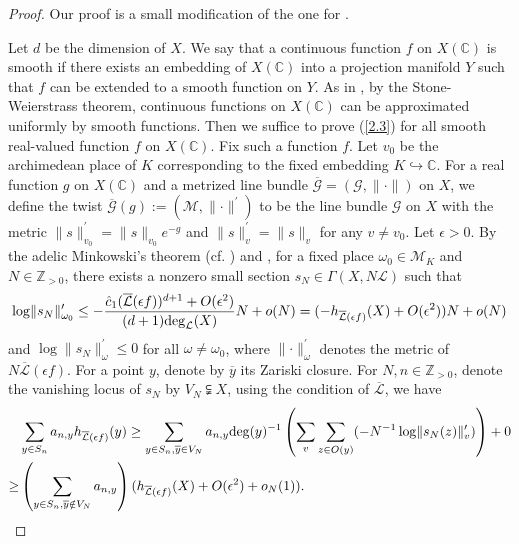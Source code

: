 \documentclass[12pt]{amsart}
\theoremstyle{plain}
\theoremstyle{remark}
\theoremstyle{definition}
\def\Z{\mathbb Z}
\def\C{\mathbb C}
\begin{document}
\begin{proof}
Our proof is a small modification of the one for \cite[Theorem 3.1]{Yuan2008}. 

Let $d$ be the dimension of $X$. We say that a continuous function $f$ on $X(\C)$ is smooth if there exists an embedding of $X(\C)$ into a projection manifold $Y$ such that $f$ can be extended to a smooth function on $Y$. As in \cite{Zhang1998}, by the Stone-Weierstrass theorem, continuous functions on $X(\C)$ can be approximated uniformly by smooth functions. Then we suffice to prove (\ref{2.3}) for all smooth real-valued function $f$ on $X(\C)$. Fix such a function $f$. Let $v_0$ be the archimedean place of $K$ corresponding to the fixed embedding $K\hookrightarrow\C$. For a real function $g$ on $X(\C)$ and a metrized line bundle $\overline{\mathcal{G}}=(\mathcal{G},\lVert\cdot\rVert)$ on $X$, we define the twist $\overline{\mathcal{G}}(g):=(\mathcal{M},\lVert\cdot\rVert^\prime)$ to be the line bundle $\mathcal{G}$ on $X$ with the metric $\lVert s\rVert^\prime_{v_0}=\lVert s\rVert_{v_0}e^{-g}$ and $\lVert s\rVert^\prime_{v}=\lVert s\rVert_{v}$ for any $v\neq v_0$. Let $\epsilon>0$. By the adelic Minkowski's theorem (cf. \cite[Appendix C]{Bombieri2006}) and \cite[Lemma 3.3]{Yuan2008}, for a fixed place $\omega_0\in\mathcal{M}_K$ and $N\in\Z_{>0}$, there exists a nonzero small section $s_N\in\Gamma(X,N\mathcal{L})$ such that $$\log\lVert s_N\rVert^\prime_{\omega_0}\leq-\frac{\hat{c}_1(\overline{\mathcal{L}}(\epsilon f))^{d+1}+O(\epsilon^2)}{(d+1){\rm deg}_{\mathcal{L}}(X)}N+o(N)=(-h_{\overline{\mathcal{L}}(\epsilon f)}(X)+O(\epsilon^2))N+o(N)$$ and $\log\lVert s_N\rVert^\prime_{\omega}\leq0$ for all $\omega\neq\omega_0$, where $\lVert\cdot\rVert^\prime_{\omega}$ denotes the metric of $N\overline{\mathcal{L}}(\epsilon f)$. For a point $y$, denote by $\overline{y}$ its Zariski closure. For $N,n\in\Z_{>0}$, denote the vanishing locus of $s_N$ by $V_N\subsetneqq X$, using the condition of $\overline{\mathcal{L}}$, we have\begin{align*}&\sum_{y\in S_n}a_{n,y}h_{\overline{\mathcal{L}}(\epsilon f)}(y)\geq\sum_{y\in S_n,\overline{y}\in V_N}a_{n,y}{\rm deg}(y)^{-1}\left(\sum_{v}\sum_{z\in O(y)}(-N^{-1}\log\lVert s_N(z)\rVert_v^\prime)\right) +0\\
	\geq&\left( \sum_{y\in S_n,\overline{y}\notin V_N}a_{n,y}\right) (h_{\overline{\mathcal{L}}(\epsilon f)}(X)+O(\epsilon^2)+o_N(1)).

\end{align*}
\end{proof}
\end{document}

